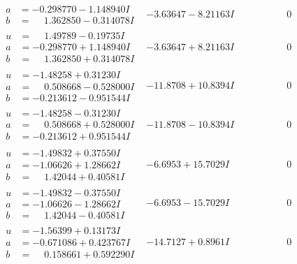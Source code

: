 \documentclass[1p]{elsarticle_modified}
\theoremstyle{definition}
\begin{document}
$$\begin{array}{c|c|c}
\begin{aligned}
a &= -0.298770 - 1.148940 I \\
b &= \phantom{-}1.362850 - 0.314078 I\end{aligned}
 & -3.63647 - 8.21163 I & \phantom{-0.000000 } 0 \\ \hline\begin{aligned}
u &= \phantom{-}1.49789 - 0.19735 I \\
a &= -0.298770 + 1.148940 I \\
b &= \phantom{-}1.362850 + 0.314078 I\end{aligned}
 & -3.63647 + 8.21163 I & \phantom{-0.000000 } 0 \\ \hline\begin{aligned}
u &= -1.48258 + 0.31230 I \\
a &= \phantom{-}0.508668 - 0.528000 I \\
b &= -0.213612 - 0.951544 I\end{aligned}
 & -11.8708 + 10.8394 I & \phantom{-0.000000 } 0 \\ \hline\begin{aligned}
u &= -1.48258 - 0.31230 I \\
a &= \phantom{-}0.508668 + 0.528000 I \\
b &= -0.213612 + 0.951544 I\end{aligned}
 & -11.8708 - 10.8394 I & \phantom{-0.000000 } 0 \\ \hline\begin{aligned}
u &= -1.49832 + 0.37550 I \\
a &= -1.06626 + 1.28662 I \\
b &= \phantom{-}1.42044 + 0.40581 I\end{aligned}
 & -6.6953 + 15.7029 I & \phantom{-0.000000 } 0 \\ \hline\begin{aligned}
u &= -1.49832 - 0.37550 I \\
a &= -1.06626 - 1.28662 I \\
b &= \phantom{-}1.42044 - 0.40581 I\end{aligned}
 & -6.6953 - 15.7029 I & \phantom{-0.000000 } 0 \\ \hline\begin{aligned}
u &= -1.56399 + 0.13173 I \\
a &= -0.671086 + 0.423767 I \\
b &= \phantom{-}0.158661 + 0.592290 I\end{aligned}
 & -14.7127 + 0.8961 I & \phantom{-0.000000 } 0 \\ \hline\begin{aligned}

\end{aligned}
\end{array}$$
\end{document}
